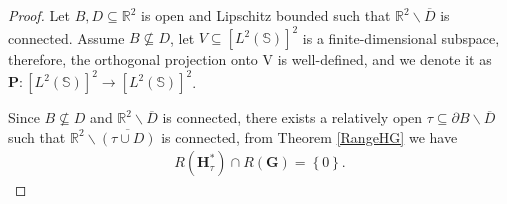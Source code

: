 \documentclass[10pt,a4paper]{amsart}
\begin{document}
\begin{proof}
Let $B, D  \subseteq \mathbb R^2$ is open and Lipschitz bounded such that $\mathbb R^2 \backslash \overline {D}$ is connected. Assume $B \nsubseteq D$, let $V \subseteq \left[L^{2}\left(\mathbb S\right) \right] ^2 $ is a finite-dimensional subspace, therefore, the orthogonal projection onto V is well-defined, and we denote it as $\mathbf P :\left[L^{2}\left(\mathbb S\right) \right] ^2 \to \left[L^{2}\left(\mathbb S\right) \right] ^2$. 

Since $B \nsubseteq D $ and $\mathbb R^2 \backslash \overline {D}$ is connected, there exists a relatively open $\tau \subseteq \partial B\backslash \overline{D}$ such that $\mathbb R^2 \backslash \overline {\left( \tau \cup D\right) }$ is connected, from Theorem \ref{RangeHG} we have
\begin{align}\label{eq:RangeHtG}
R\left( \mathbf H^*_{\tau} \right) \cap R\left( \mathbf G\right) =\left\lbrace 0\right\rbrace .
\end{align}


\end{proof}
\end{document}
